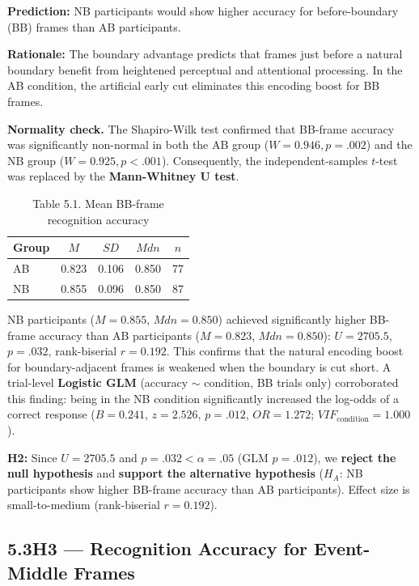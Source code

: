 \documentclass[11pt]{article}
\begin{document}
\textbf{Prediction:} NB participants would show higher accuracy for before-boundary (BB) frames than AB participants.

\textbf{Rationale:} The boundary advantage predicts that frames just before a natural boundary benefit from heightened perceptual and attentional processing. In the AB condition, the artificial early cut eliminates this encoding boost for BB frames.

\textbf{Normality check.} The Shapiro-Wilk test confirmed that BB-frame accuracy was significantly non-normal in both the AB group ($W = 0.946, p = .002$) and the NB group ($W = 0.925, p < .001$). Consequently, the independent-samples $t$-test was replaced by the \textbf{Mann-Whitney U test}.

\begin{table}[H]
    \centering\small
    \caption*{Table 5.1.\; Mean BB-frame recognition accuracy}
    \begin{tabular}{@{} l c c c c @{}}
        \toprule
        Group & $M$   & $SD$  & $Mdn$ & $n$ \\
        \midrule
        AB    & 0.823 & 0.106 & 0.850 & 77  \\
        NB    & 0.855 & 0.096 & 0.850 & 87  \\
        \bottomrule
    \end{tabular}
\end{table}

NB participants ($M = 0.855$, $Mdn = 0.850$) achieved significantly higher BB-frame accuracy than AB participants ($M = 0.823$, $Mdn = 0.850$): $U = 2705.5$, $p = .032$, rank-biserial $r = 0.192$. This confirms that the natural encoding boost for boundary-adjacent frames is weakened when the boundary is cut short. A trial-level \textbf{Logistic GLM} (accuracy $\sim$ condition, BB trials only) corroborated this finding: being in the NB condition significantly increased the log-odds of a correct response ($B = 0.241$, $z = 2.526$, $p = .012$, $OR = 1.272$; $VIF_{\text{condition}} = 1.000$).

\textbf{H2:} Since $U = 2705.5$ and $p = .032 < \alpha = .05$ (GLM $p = .012$), we \textbf{reject the null hypothesis} and \textbf{support the alternative hypothesis} ($H_A$: NB participants show higher BB-frame accuracy than AB participants). Effect size is small-to-medium (rank-biserial $r = 0.192$).

\subsection*{5.3\quad H3 --- Recognition Accuracy for Event-Middle Frames}
\end{document}
